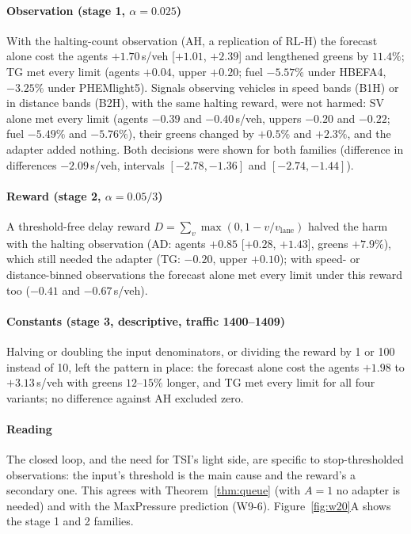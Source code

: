 \paragraph{Observation (stage 1, $\alpha=0.025$)} With the halting-count observation (AH, a replication of RL-H) the forecast alone cost
the agents $+1.70$\,s/veh [$+1.01$, $+2.39$] and lengthened greens by $11.4\%$; TG met every limit (agents $+0.04$, upper $+0.20$; fuel
$-5.57\%$ under HBEFA4, $-3.25\%$ under PHEMlight5). Signals observing vehicles in speed bands (B1H) or in distance bands (B2H), with the
same halting reward, were not harmed: SV alone met every limit (agents $-0.39$ and $-0.40$\,s/veh, uppers $-0.20$ and $-0.22$; fuel
$-5.49\%$ and $-5.76\%$), their greens changed by $+0.5\%$ and $+2.3\%$, and the adapter added nothing. Both decisions were shown for both
families (difference in differences $-2.09$\,s/veh, intervals $[-2.78, -1.36]$ and $[-2.74, -1.44]$).
\paragraph{Reward (stage 2, $\alpha=0.05/3$)} A threshold-free delay reward $D=\sum_v \max(0, 1-v/v_{\mathrm{lane}})$ halved the harm
with the halting observation (AD: agents $+0.85$ [$+0.28$, $+1.43$], greens $+7.9\%$), which still needed the adapter (TG: $-0.20$, upper
$+0.10$); with speed- or distance-binned observations the forecast alone met every limit under this reward too ($-0.41$ and $-0.67$\,s/veh).
\paragraph{Constants (stage 3, descriptive, traffic 1400--1409)} Halving or doubling the input denominators, or dividing the reward by 1
or 100 instead of 10, left the pattern in place: the forecast alone cost the agents $+1.98$ to $+3.13$\,s/veh with greens $12$--$15\%$
longer, and TG met every limit for all four variants; no difference against AH excluded zero.
\paragraph{Reading} The closed loop, and the need for TSI's light side, are specific to stop-thresholded observations: the input's threshold
is the main cause and the reward's a secondary one. This agrees with Theorem~\ref{thm:queue} (with $A=1$ no adapter is needed) and with
the MaxPressure prediction (W9-6). Figure~\ref{fig:w20}A shows the stage 1 and 2 families.

